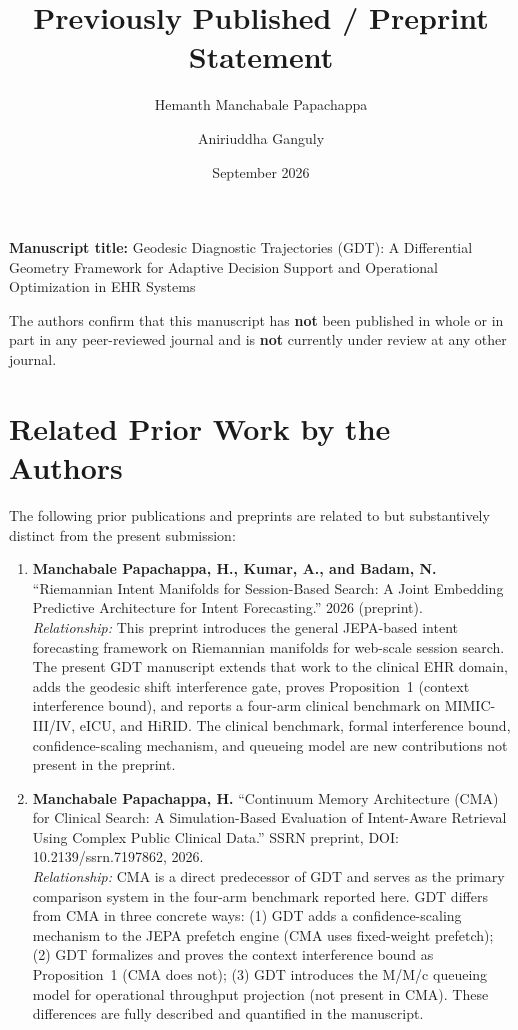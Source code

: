 \documentclass[11pt]{article}
\title{Previously Published / Preprint Statement}
\author{Hemanth Manchabale Papachappa \and Aniriuddha Ganguly}
\date{September 2026}
\begin{document}
\maketitle

\noindent\textbf{Manuscript title:} Geodesic Diagnostic Trajectories (GDT):
A Differential Geometry Framework for Adaptive Decision Support and Operational
Optimization in EHR Systems

\bigskip

\noindent The authors confirm that this manuscript has \textbf{not} been published
in whole or in part in any peer-reviewed journal and is \textbf{not} currently
under review at any other journal.

\bigskip
\section*{Related Prior Work by the Authors}

The following prior publications and preprints are related to but substantively
distinct from the present submission:

\begin{enumerate}

\item \textbf{Manchabale Papachappa, H., Kumar, A., and Badam, N.}
``Riemannian Intent Manifolds for Session-Based Search: A Joint Embedding
Predictive Architecture for Intent Forecasting.'' 2026 (preprint).\\
\textit{Relationship:} This preprint introduces the general JEPA-based intent
forecasting framework on Riemannian manifolds for web-scale session search. The
present GDT manuscript extends that work to the clinical EHR domain, adds the
geodesic shift interference gate, proves Proposition~1 (context interference
bound), and reports a four-arm clinical benchmark on MIMIC-III/IV, eICU, and
HiRID. The clinical benchmark, formal interference bound, confidence-scaling
mechanism, and queueing model are new contributions not present in the preprint.

\item \textbf{Manchabale Papachappa, H.}
``Continuum Memory Architecture (CMA) for Clinical Search: A Simulation-Based
Evaluation of Intent-Aware Retrieval Using Complex Public Clinical Data.''
SSRN preprint, DOI: 10.2139/ssrn.7197862, 2026.\\
\textit{Relationship:} CMA is a direct predecessor of GDT and serves as the
primary comparison system in the four-arm benchmark reported here. GDT differs
from CMA in three concrete ways: (1) GDT adds a confidence-scaling mechanism to
the JEPA prefetch engine (CMA uses fixed-weight prefetch); (2) GDT formalizes and
proves the context interference bound as Proposition~1 (CMA does not); (3) GDT
introduces the M/M/c queueing model for operational throughput projection (not
present in CMA). These differences are fully described and quantified in the
manuscript.

\end{enumerate}
\end{document}
